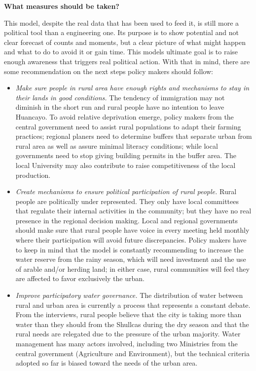 \documentclass{article}
\begin{document}
{\bf What measures should be taken?}

This model, despite the real data that has been used to feed it, is still more a political tool than a engineering one. Its purpose is to show potential and not clear forecast of counts and moments, but a clear picture of what might happen and what to do to avoid it or gain time. This model\textquotesingle s ultimate goal is to raise enough awareness that triggers real political action. With that in mind, there are some recommendation on the next steps policy makers should follow:

\begin{itemize}
\item \emph{Make sure people in rural area have enough rights and mechanisms to stay in their lands in good conditions.} The tendency of immigration may not diminish in the short run and rural people have no intention to leave Huancayo. To avoid relative deprivation emerge, policy makers from the central government need to assist rural populations to adapt their farming practices; regional planers need to determine buffers that separate urban from rural area as well as assure minimal literacy conditions; while local governments need to stop giving building permits in the buffer area. The local University may also contribute to raise competitiveness of the local production.

\item \emph{Create mechanisms to ensure political participation of rural people.} Rural people are politically under represented. They only have local committees that regulate their internal activities in the community; but they have no real presence in the regional decision making. Local and regional governments should make sure that rural people have voice in every meeting held monthly where their participation will avoid future discrepancies. Policy makers have to keep in mind that the model is constantly recommending to increase the water reserve from the rainy season, which will need investment and the use of arable and/or herding land; in either case, rural communities will feel they are affected to favor exclusively the urban.

\item \emph{Improve participatory water governance.} The distribution of water between rural and urban area is currently a process that represents a constant debate. From the interviews, rural people believe that the city is taking more than water than they should from the Shullcas during the dry season and that the rural needs are relegated due to the pressure of the urban majority. Water management has many actors involved, including two Ministries from the central government (Agriculture and Environment), but the technical criteria adopted so far is biased toward the needs of the urban area. 



\end{itemize}
\end{document}
